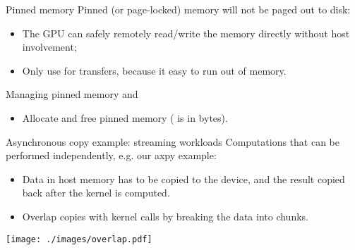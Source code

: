 \documentclass[aspectratio=43]{beamer}
\newcommand{\axpy}{{\ttfamily axpy}\xspace}
\begin{document}
\begin{frame}[fragile]{Pinned memory}
    Pinned (or page-locked) memory will not be paged out to disk:
    \begin{itemize}
        \item The GPU can safely remotely read/write the memory directly without host involvement;
        \item Only use for transfers, because it easy to run out of memory.
    \end{itemize}

    \begin{info}{Managing pinned memory}
        \centering {} and 
        \begin{itemize}
            \item Allocate and free pinned memory ( is in bytes).
        \end{itemize}
    \end{info}

\end{frame}

\begin{frame}[fragile]{}
    \begin{info}{Asynchronous copy example: streaming workloads}
        Computations that can be performed independently, e.g. our \axpy example:
        \begin{itemize}
            \item Data in host memory has to be copied to the device, and the result copied back after the kernel is computed.
            \item Overlap copies with kernel calls by breaking the data into chunks.
        \end{itemize}
    \end{info}
    \texttt{[image: ./images/overlap.pdf]}
\end{frame}
\end{document}
